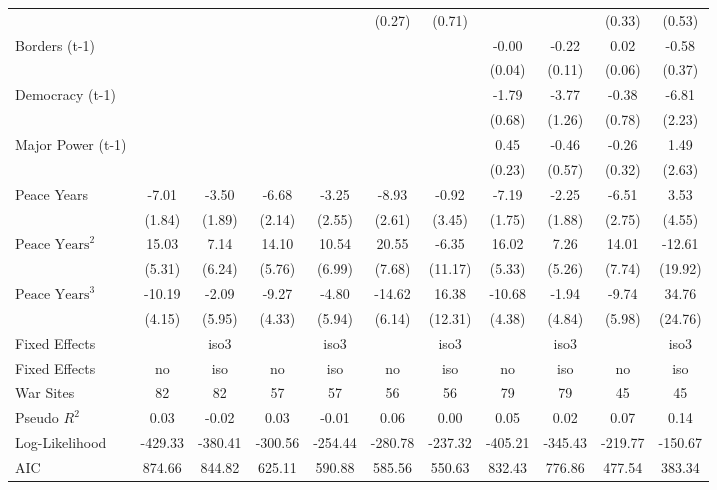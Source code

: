 \begin{tabular}{lcccccccccc}
&  &  &  &  & (0.27) & (0.71) &  &  & (0.33) & (0.53) \\
Borders (t-1) &  &  &  &  &  &  & -0.00 & -0.22 & 0.02 & -0.58 \\
&  &  &  &  &  &  & (0.04) & (0.11) & (0.06) & (0.37) \\
Democracy (t-1) &  &  &  &  &  &  & -1.79 & -3.77 & -0.38 & -6.81 \\
&  &  &  &  &  &  & (0.68) & (1.26) & (0.78) & (2.23) \\
Major Power (t-1) &  &  &  &  &  &  & 0.45 & -0.46 & -0.26 & 1.49 \\
&  &  &  &  &  &  & (0.23) & (0.57) & (0.32) & (2.63) \\
Peace Years & -7.01 & -3.50 & -6.68 & -3.25 & -8.93 & -0.92 & -7.19 & -2.25 & -6.51 & 3.53 \\
& (1.84) & (1.89) & (2.14) & (2.55) & (2.61) & (3.45) & (1.75) & (1.88) & (2.75) & (4.55) \\
$\text{Peace Years}^2$ & 15.03 & 7.14 & 14.10 & 10.54 & 20.55 & -6.35 & 16.02 & 7.26 & 14.01 & -12.61 \\
& (5.31) & (6.24) & (5.76) & (6.99) & (7.68) & (11.17) & (5.33) & (5.26) & (7.74) & (19.92) \\
$\text{Peace Years}^3$ & -10.19 & -2.09 & -9.27 & -4.80 & -14.62 & 16.38 & -10.68 & -1.94 & -9.74 & 34.76 \\
& (4.15) & (5.95) & (4.33) & (5.94) & (6.14) & (12.31) & (4.38) & (4.84) & (5.98) & (24.76) \\
Fixed Effects &  & iso3 &  & iso3 &  & iso3 &  & iso3 &  & iso3 \\
\midrule
Fixed Effects & no & iso & no & iso & no & iso & no & iso & no & iso \\
War Sites & 82 & 82 & 57 & 57 & 56 & 56 & 79 & 79 & 45 & 45 \\
Pseudo $R^2$ & 0.03 & -0.02 & 0.03 & -0.01 & 0.06 & 0.00 & 0.05 & 0.02 & 0.07 & 0.14 \\
Log-Likelihood & -429.33 & -380.41 & -300.56 & -254.44 & -280.78 & -237.32 & -405.21 & -345.43 & -219.77 & -150.67 \\
AIC & 874.66 & 844.82 & 625.11 & 590.88 & 585.56 & 550.63 & 832.43 & 776.86 & 477.54 & 383.34 \\
\bottomrule
\end{tabular}
